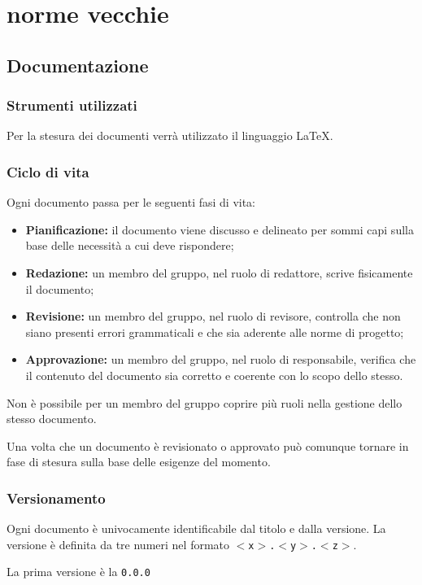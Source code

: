 \documentclass[a4paper, 12pt]{article}
\begin{document}
\pagebreak
\section{norme vecchie}
\subsection{Documentazione}\label{documentazione}

\subsubsection{Strumenti utilizzati}
Per la stesura dei documenti verrà utilizzato il linguaggio \LaTeX.

\subsubsection{Ciclo di vita}
Ogni documento passa per le seguenti fasi di vita:
\begin{itemize}
\item \textbf{Pianificazione:} il documento viene discusso e delineato per sommi capi sulla base delle necessità a cui deve rispondere;
\item \textbf{Redazione:} un membro del gruppo, nel ruolo di redattore, scrive fisicamente il documento;
\item \textbf{Revisione:} un membro del gruppo, nel ruolo di revisore, controlla che non siano presenti errori grammaticali e che sia aderente alle norme di progetto;
\item \textbf{Approvazione:} un membro del gruppo, nel ruolo di responsabile, verifica che il contenuto del documento sia corretto e coerente con lo scopo dello stesso.
\end{itemize}

Non è possibile per un membro del gruppo coprire più ruoli nella gestione dello stesso documento.

Una volta che un documento è revisionato o approvato può comunque tornare in fase di stesura sulla base delle esigenze del momento.

\subsubsection{Versionamento}
Ogni documento è univocamente identificabile dal titolo e dalla versione. La versione è definita da tre numeri nel formato \texttt{$<$x$>$.$<$y$>$.$<$z$>$}.

La prima versione è la \texttt{0.0.0}
\end{document}
